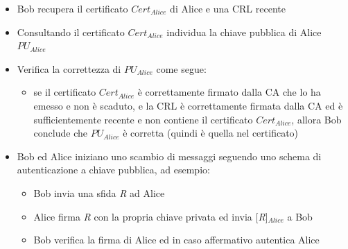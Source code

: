 \begin{itemize}
	\item Bob recupera il certificato \textit{$Cert_{Alice}$} di Alice  e una CRL recente
	\item Consultando il certificato \textit{$Cert_{Alice}$} individua la chiave pubblica di Alice \textit{$PU_{Alice}$}
	\item Verifica la correttezza di \textit{$PU_{Alice}$} come segue:
	\begin{itemize}
		\item se il certificato \textit{$Cert_{Alice}$} è correttamente firmato dalla CA che lo ha emesso e non è scaduto, e
		la CRL è correttamente firmata dalla CA ed è sufficientemente recente e non contiene il certificato \textit{$Cert_{Alice}$}, allora Bob conclude che \textit{$PU_{Alice}$} è corretta (quindi è quella nel certificato)
	\end{itemize}
	\item Bob ed Alice iniziano uno scambio di messaggi seguendo uno schema di autenticazione a chiave pubblica, ad esempio:
	\begin{itemize}
		\item Bob invia una sfida \textit{R} ad Alice
		\item Alice firma \textit{R} con la propria chiave privata ed invia [\textit{R}]\textit{$_{Alice}$} a Bob
		\item Bob verifica la firma di Alice ed in caso affermativo autentica Alice
	\end{itemize}
\end{itemize}